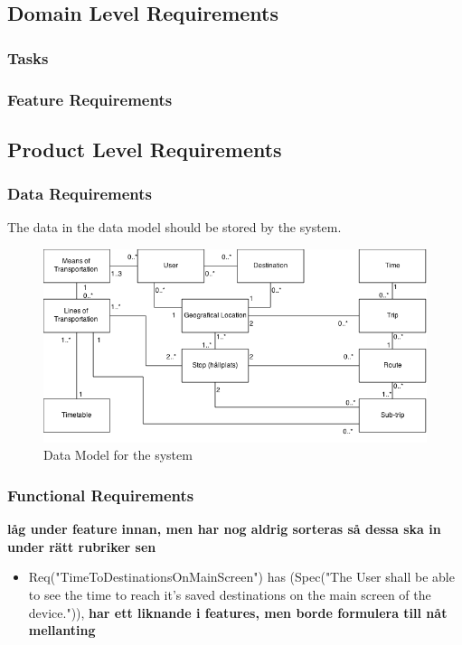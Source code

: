 \documentclass[a4paper]{article}
\begin{document}
		\subsection{Domain Level Requirements}
			\subsubsection{Tasks}
				
			\subsubsection{Feature Requirements}
								
			
		\subsection{Product Level Requirements}		
			\subsubsection{Data Requirements}
				The data in the data model should be stored by the system.	
				\begin{figure}[h]
					\includegraphics[scale=0.50]{datamodel-v2.png}
					\caption{Data Model for the system}
				\end{figure}
				
				
				
			\subsubsection{Functional Requirements}
				
		
				\textbf{låg under feature innan, men har nog aldrig sorteras så dessa ska in under rätt rubriker sen}
			
				\begin{itemize}
					


					\item Req("TimeToDestinationsOnMainScreen") has (Spec("The User shall be able to see the time to reach it's saved destinations on the main screen of the device.")), \textbf{har ett liknande i features, men borde formulera till nåt mellanting}
				\end{itemize}	
					
\end{document}
